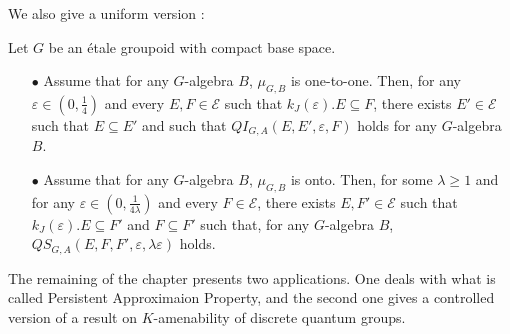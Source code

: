 We also give a uniform version :
\begin{thm} Let $G$ be an étale groupoid with compact base space. 
\begin{itemize}
\item[$\bullet$] Assume that for any $G$-algebra $B$, $\mu_{G,B}$ is one-to-one. Then, for any $\varepsilon\in (0,\frac{1}{4})$ and every $E,F\in\mathcal E$ such that $k_J(\varepsilon). E\subseteq F$, there exists $E'\in\mathcal E$ such that $E\subseteq E'$ and such that $QI_{G,A}(E,E',\varepsilon,F)$ holds for any $G$-algebra $B$.
\item[$\bullet$] Assume that for any $G$-algebra $B$, $\mu_{G,B}$ is onto. Then, for some $\lambda \geq 1$ and for any $\varepsilon\in (0,\frac{1}{4\lambda})$ and every $F\in\mathcal E$, there exists $E,F'\in\mathcal E$ such that $k_J(\varepsilon). E\subseteq F'$ and $F\subseteq F'$ such that, for any $G$-algebra $B$, $QS_{G,A}(E, F,F',\varepsilon,\lambda \varepsilon)$ holds.
\end{itemize}
\end{thm}

The remaining of the chapter presents two applications. One deals with what is called Persistent Approximaion Property, and the second one gives a controlled version of a result on $K$-amenability of discrete quantum groups. \\

